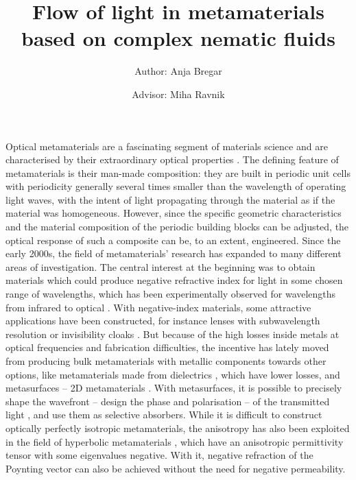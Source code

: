 \documentclass[a4paper,11pt]{article}
\title{\huge{Flow of light in metamaterials based on complex nematic fluids}}
\author{Author: Anja Bregar \and Advisor: Miha Ravnik}
\begin{document}
\onehalfspacing

\maketitle

% 
% 
% 
%




Optical metamaterials are a fascinating segment of materials science and are characterised by their extraordinary optical properties \cite{wegener-2011-nature-review}.
The defining feature of metamaterials is their man-made composition: they are built in periodic unit cells with periodicity generally several times smaller than the wavelength of operating light waves, with the intent of light propagating through the material as if the material was homogeneous. 
However, since the specific geometric characteristics and the material composition of the periodic building blocks can be adjusted, the optical response of such a composite can be, to an extent, engineered. 
Since the early 2000s, the field of metamaterials' research has expanded to many different areas of investigation. 
The central interest at the beginning was to obtain materials which could produce negative refractive index for light in some chosen range of wavelengths, which has been experimentally observed for wavelengths from infrared to optical \cite{schultz-2000-first-mtm,zhang-2008-fishnet}. 
With negative-index materials, some attractive applications have been constructed, for instance lenses with subwavelength resolution or invisibility cloaks \cite{capasso-2016-metalens,zhang-2015-skin-cloak}. 
But because of the high losses inside metals at optical frequencies and fabrication difficulties, the incentive has lately moved from producing bulk metamaterials with metallic components towards other options, like metamaterials made from dielectrics \cite{jacob-2016-all-dielectric}, which have lower losses, and metasurfaces -- 2D metamaterials \cite{capasso-2014-flat-optics-metasurface}. 
With metasurfaces, it is possible to precisely shape the wavefront -- design the phase and polarisation -- of the transmitted light \cite{capasso-2014-flat-optics-metasurface}, and use them as selective absorbers. 
While it is difficult to construct optically perfectly isotropic metamaterials, the anisotropy has also been exploited in the field of hyperbolic metamaterials \cite{kivshar-2013-hyperbolic}, which have an anisotropic permittivity tensor with some eigenvalues negative. 
With it, negative refraction of the Poynting vector can also be achieved without the need for negative permeability.
\end{document}
